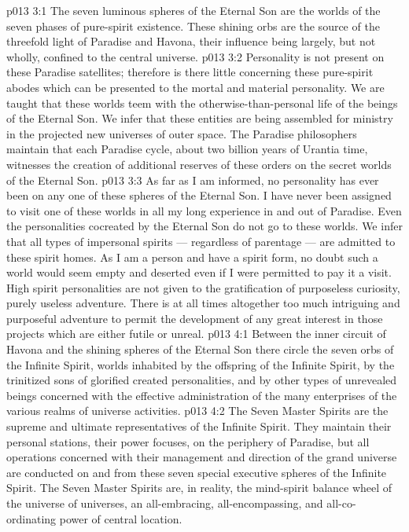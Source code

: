 \vs p013 3:1 The seven luminous spheres of the Eternal Son are the worlds of the seven phases of pure\hyp{}spirit existence. These shining orbs are the source of the threefold light of Paradise and Havona, their influence being largely, but not wholly, confined to the central universe.
\vs p013 3:2 Personality is not present on these Paradise satellites; therefore is there little concerning these pure\hyp{}spirit abodes which can be presented to the mortal and material personality. We are taught that these worlds teem with the otherwise\hyp{}than\hyp{}personal life of the beings of the Eternal Son. We infer that these entities are being assembled for ministry in the projected new universes of outer space. The Paradise philosophers maintain that each Paradise cycle, about two billion years of Urantia time, witnesses the creation of additional reserves of these orders on the secret worlds of the Eternal Son.
\vs p013 3:3 \pc As far as I am informed, no personality has ever been on any one of these spheres of the Eternal Son. I have never been assigned to visit one of these worlds in all my long experience in and out of Paradise. Even the personalities cocreated by the Eternal Son do not go to these worlds. We infer that all types of impersonal spirits --- regardless of parentage --- are admitted to these spirit homes. As I am a person and have a spirit form, no doubt such a world would seem empty and deserted even if I were permitted to pay it a visit. High spirit personalities are not given to the gratification of purposeless curiosity, purely useless adventure. There is at all times altogether too much intriguing and purposeful adventure to permit the development of any great interest in those projects which are either futile or unreal.
\vs p013 4:1 Between the inner circuit of Havona and the shining spheres of the Eternal Son there circle the seven orbs of the Infinite Spirit, worlds inhabited by the offspring of the Infinite Spirit, by the trinitized sons of glorified created personalities, and by other types of unrevealed beings concerned with the effective administration of the many enterprises of the various realms of universe activities.
\vs p013 4:2 The Seven Master Spirits are the supreme and ultimate representatives of the Infinite Spirit. They maintain their personal stations, their power focuses, on the periphery of Paradise, but all operations concerned with their management and direction of the grand universe are conducted on and from these seven special executive spheres of the Infinite Spirit. The Seven Master Spirits are, in reality, the mind\hyp{}spirit balance wheel of the universe of universes, an all\hyp{}embracing, all\hyp{}encompassing, and all\hyp{}co\hyp{}ordinating power of central location.
